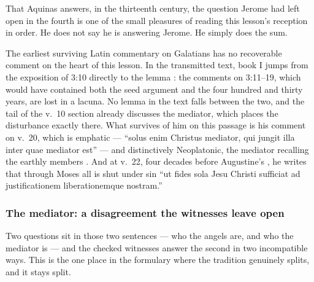 That Aquinas answers, in the thirteenth century, the question Jerome had left
open in the fourth is one of the small pleasures of reading this lesson's
reception in order. He does not say he is answering Jerome. He simply does the
sum.

\begin{witnessnote}
The earliest surviving Latin commentary on Galatians has no recoverable
comment on the heart of this lesson. In the transmitted text, book I jumps from
the exposition of 3:10 directly to the lemma : the comments on
3:11--19, which would have contained both the seed argument and the four
hundred and thirty years, are lost in a lacuna. No  lemma in the
text falls between the two, and the tail of the v.~10 section already
discusses the mediator, which places the disturbance exactly there. What survives of him on this passage is his comment on v.~20, which is
emphatic --- ``solus enim Christus mediator, qui jungit illa inter quae
mediator est'' --- and distinctively Neoplatonic, the mediator recalling the
earthly members . And at v.~22, four decades
before Augustine's , he writes that through Moses all is shut
under sin ``ut fides sola Jesu Christi sufficiat ad
justificationem liberationemque nostram.''
\end{witnessnote}

\subsubsection*{The mediator: a disagreement the witnesses leave open}

 Two questions sit in those two sentences --- who the
angels are, and who the mediator is --- and the checked witnesses answer the
second in two incompatible ways. This is the one place in the formulary where
the tradition genuinely splits, and it stays split.

